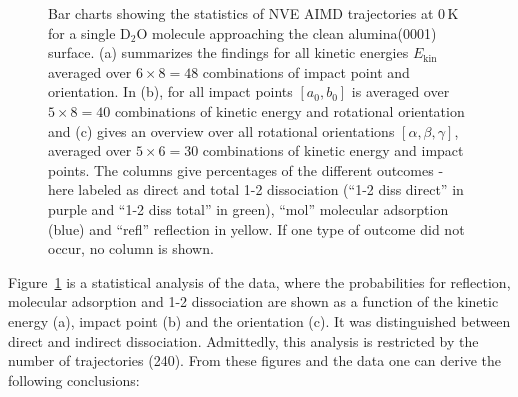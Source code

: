 \documentclass[11pt,DIV=13,BCOR=5mm,a4paper,headinclude]{scrbook}
\begin{document}
  \begin{figure}[h!]
\centering
 \quad
 \quad
\caption{Bar charts showing the statistics of NVE AIMD trajectories at $0\,$K for a single D$_2$O molecule approaching the clean alumina(0001) surface.
(a) summarizes the findings for all kinetic energies $E_\textrm{kin}$ averaged over $6\times 8=48$ combinations of impact point and orientation.
In (b), for all impact points $[a_0,b_0]$ is averaged over $5 \times 8=40$ combinations of kinetic energy and rotational orientation and (c) gives an overview over all rotational orientations $[\alpha,\beta,\gamma]$, averaged over $5 \times 6=30$ combinations of kinetic energy and impact points.
The columns give percentages of the different outcomes - here labeled as direct and total 1-2 dissociation (``1-2 diss direct'' in purple and  ``1-2 diss total'' in green), ``mol'' molecular adsorption (blue) and ``refl'' reflection in yellow.
If one type of outcome did not occur, no column is shown.}
\label{abb:barchart_mic}
\end{figure}
Figure~\ref{abb:barchart_mic} is a statistical analysis of the data, where the probabilities for reflection, molecular adsorption and 1-2 dissociation are shown as a function of the kinetic energy (a), impact point (b) and the orientation (c).
It was distinguished between direct and indirect dissociation.
Admittedly, this analysis is restricted by the number of trajectories (240).
From these figures and the data one can derive the following conclusions:
\end{document}
